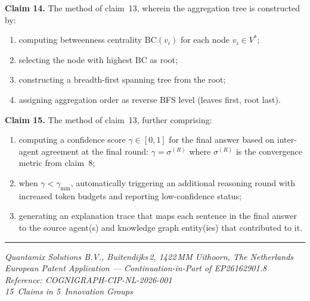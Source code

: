 \documentclass[a4paper,12pt]{article}
\begin{document}
\bigskip

\noindent\textbf{Claim 14.} The method of claim~13, wherein the aggregation tree is constructed by:

\begin{enumerate}[label=(\alph*),nosep,leftmargin=2em]
\item computing betweenness centrality $\mathrm{BC}(v_i)$ for each node $v_i \in V^*$;
\item selecting the node with highest $\mathrm{BC}$ as root;
\item constructing a breadth-first spanning tree from the root;
\item assigning aggregation order as reverse BFS level (leaves first, root last).
\end{enumerate}

\bigskip

\noindent\textbf{Claim 15.} The method of claim~13, further comprising:

\begin{enumerate}[label=(\alph*),nosep,leftmargin=2em]
\item computing a confidence score $\gamma \in [0, 1]$ for the final answer based on inter-agent agreement at the final round: $\gamma = \sigma^{(R)}$ where $\sigma^{(R)}$ is the convergence metric from claim~8;
\item when $\gamma < \gamma_{\min}$, automatically triggering an additional reasoning round with increased token budgets and reporting low-confidence status;
\item generating an explanation trace that maps each sentence in the final answer to the source agent(s) and knowledge graph entity(ies) that contributed to it.
\end{enumerate}

\vspace{15mm}

\noindent\rule{\textwidth}{0.4pt}

\begin{center}
{\small\itshape Quantamix Solutions B.V., Buitendijks\,2, 1422\,MM Uithoorn, The Netherlands\\
European Patent Application --- Continuation-in-Part of EP26162901.8\\
Reference: COGNIGRAPH-CIP-NL-2026-001\\
15~Claims in 5~Innovation Groups}
\end{center}
\end{document}

